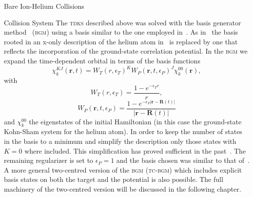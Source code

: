 \documentclass[a5paper, 9 pt]{extreport}
\begin{document}
\begin{chapter}{Bare Ion-Helium Collisions \label{chap:p-he2p-he}}
\begin{section}{Collision System \label{sec:p-he2p-he-sys}}
      The \textsc{tdks} described above was solved with the basis generator method~\cite{bgm}
      (\textsc{bgm}) using a basis similar to the one employed in~\cite{keim-ihe}. As in~\cite{pbarhe}
      the basis rooted in an x-only description of the helium atom in~\cite{keim-ihe} is replaced by one
      that reflects the incorporation of the ground-state correlation potential. In the \textsc{bgm} we
      expand the time-dependent orbital in terms of the basis functions
      \begin{equation} \label{eq:bgmbasis}
         \chi^{KJ}_k (\mathbf{r},t)
         = W_T(r,\epsilon_T)^K W_P( \mathbf{r},t, \epsilon_P)^J \chi^{00}_k (\mathbf{r}),
      \end{equation}
      with
      \begin{equation}
         W_T(r,\epsilon_T) = \frac{1 - e^{-\epsilon_T r}}{r},
      \end{equation}
      \begin{equation}
         W_P (\mathbf{r},t,\epsilon_P)
         = \frac{1 - e^{-\epsilon_P|\mathbf{r} - \mathbf{R}(t)|}}{|\mathbf{r} - \mathbf{R}(t)|}
      \end{equation}
      and $\chi^{00}_k$ the eigenstates of the initial Hamiltonian (in this case the ground-state
      Kohn-Sham system for the helium atom). In order to keep the number of states in the basis to a
      minimum and simplify the description only those states with $K = 0$ where included. This
      simplification has proved sufficient in the past~\cite{bgm-rev}. The remaining regularizer is set
      to $\epsilon_P = 1$ and the basis chosen was similar to that of~\cite{keim-ihe}. A more general
      two-centred version of the \textsc{bgm} (\textsc{tc-bgm}) which includes explicit basis states on
      both the target and the potential is also possible. The full machinery of the two-centred version
      will be discussed in the following chapter.


\end{section}
\end{chapter}
\end{document}
